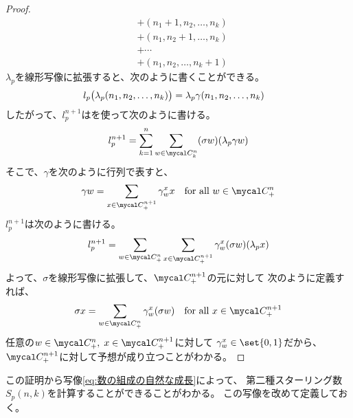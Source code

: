 \begin{proof}
\begin{equation}
\begin{split}
			&+ (n_1+1,n_2,\dots,n_k) \\
			&+ (n_1,n_2+1,\dots,n_k) \\
			&+\cdots \\
			&+ (n_1,n_2,\dots,n_k+1)
		\end{split}\end{equation} %
		$\lambda_p$を線形写像に拡張すると、次のように書くことができる。
		\begin{equation*}\begin{split} %
			l_p\bigl(\lambda_p(n_1,n_2,\dots,n_k)\bigr)
			&= \lambda_p\grow(n_1,n_2,\dots,n_k)
		\end{split}\end{equation*} %
		したがって、$l_p^{n+1}$は\grow{}を使って次のように書ける。
		\begin{equation*}\begin{split} %
			l_p^{n+1} &= \sum_{k=1}^n\sum_{w\in\sosei_k^n}
				(\sigma w)(\lambda_p\grow w) \\
		\end{split}\end{equation*} %
		そこで、$\gamma$を次のように行列で表すと、
		\begin{equation*}\begin{split} %
			\grow w = \sum_{x\in\sosei_+^{n+1}}\grow_w^x x
			\quad\text{for all }w\in\sosei_+^n
		\end{split}\end{equation*} %
		$l_p^{n+1}$は次のように書ける。
		\begin{equation*}\begin{split} %
			l_p^{n+1} &= \sum_{w\in\sosei_+^n}\sum_{x\in\sosei_+^{n+1}}
				\grow_w^x(\sigma w)(\lambda_px) \\
		\end{split}\end{equation*} %
		よって、$\sigma$を線形写像に拡張して、$\sosei_+^{n+1}$の元に対して
		次のように定義すれば、
		\begin{equation*}\begin{split} %
			\sigma x = \sum_{w\in\sosei_+^n}\grow_w^x(\sigma w)
			\quad\text{for all }x\in\sosei_+^{n+1}
		\end{split}\end{equation*} %
		任意の$w\in\sosei_+^n,\;x\in\sosei_+^{n+1}$に対して
		$\grow_w^x\in\set{0,1}$だから、
		$\sosei_+^{n+1}$に対して予想が成り立つことがわかる。
	\end{proof} %

	この証明から写像\grow{}\eqref{eq:数の組成の自然な成長}によって、
	第二種スターリング数$S_p(n,k)$を計算することができることがわかる。
	この写像を改めて定義しておく。

